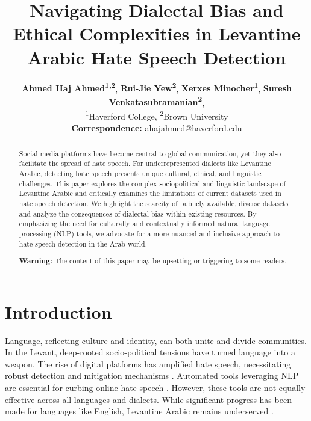 \documentclass[11pt]{article}
\title{Navigating Dialectal Bias and Ethical Complexities in Levantine Arabic Hate Speech Detection}
\author{
 \textbf{Ahmed Haj Ahmed\textsuperscript{1,2}},
 \textbf{Rui-Jie Yew\textsuperscript{2}},
 \textbf{Xerxes Minocher\textsuperscript{1}},
 \textbf{Suresh Venkatasubramanian\textsuperscript{2}},
\\
 \textsuperscript{1}Haverford College,
 \textsuperscript{2}Brown University
\\
 \small{
   \textbf{Correspondence:} \href{mailto:ahajahmed@haverford.edu}{ahajahmed@haverford.edu}
 }
}
\begin{document}
\maketitle


\begin{abstract}


Social media platforms have become central to global communication, yet they also facilitate the spread of hate speech. For underrepresented dialects like Levantine Arabic, detecting hate speech presents unique cultural, ethical, and linguistic challenges. This paper explores the complex sociopolitical and linguistic landscape of Levantine Arabic and critically examines the limitations of current datasets used in hate speech detection. We highlight the scarcity of publicly available, diverse datasets and analyze the consequences of dialectal bias within existing resources. By emphasizing the need for culturally and contextually informed natural language processing (NLP) tools, we advocate for a more nuanced and inclusive approach to hate speech detection in the Arab world. 

\vspace{0.3em}

\noindent \textbf{Warning:} The content of this paper may be upsetting or triggering to some readers.
\end{abstract}




\section{Introduction}

Language, reflecting culture and identity, can both unite and divide communities. In the Levant, deep-rooted socio-political tensions have turned language into a weapon. The rise of digital platforms has amplified hate speech, necessitating robust detection and mitigation mechanisms \citep{CASTANOPULGARIN2021101608, https://doi.org/10.1002/1944-2866.POI364}. Automated tools leveraging NLP are essential for curbing online hate speech \citep{JAHAN2023126232}. However, these tools are not equally effective across all languages and dialects. While significant progress has been made for languages like English, Levantine Arabic remains underserved \citep{bender2019rule}.
\end{document}
